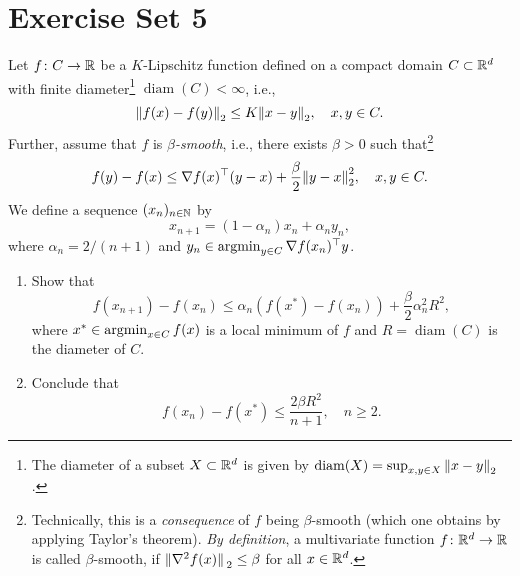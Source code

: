\section{Exercise Set 5}

\begin{exercise}
\end{exercise}


\begin{exercise}
\end{exercise}


\begin{exercise}
Let $f \colon C \to \mathbb{R}$ be a $K$-Lipschitz function defined on a compact domain $C \subset \mathbb{R}^d$ with finite diameter\footnote{The diameter of a subset $X \subset \mathbb{R}^d$ is given by $\operatorname{diam}(X) = \sup_{x, y \in X} \norm{x - y}_2$.} $\operatorname{diam}(C) < \infty$, i.e.,
\[
    \norm{f(x) - f(y)}_2 \leq K \norm{x - y}_2, \quad x, y \in C.
\]
Further, assume that $f$ is \emph{$\beta$-smooth}, i.e., there exists $\beta > 0$ such that\footnote{Technically, this is a \emph{consequence} of $f$ being $\beta$-smooth (which one obtains by applying Taylor's theorem). \emph{By definition}, a multivariate function $f \colon \mathbb{R}^d \to \mathbb{R}$ is called $\beta$-smooth, if $\norm*{\nabla^2 f(x)}_2 \leq \beta$ for all $x \in \mathbb{R}^d$.}
\[
    f(y) - f(x) \leq \nabla f(x)^{\top} (y - x) + \frac{\beta}{2} \norm{y - x}_2^2, \quad x, y \in C.
\]
We define a sequence $(x_n)_{n \in \mathbb{N}}$ by
\[
    x_{n+1} = (1 - \alpha_n)x_n + \alpha_n y_n,
\]
where $\alpha_n = 2 / (n+1)$ and $y_n \in \operatorname*{argmin}_{y \in C} \nabla f(x_n)^{\top} y$.
\begin{enumerate}
    \item Show that
            \[
                f(x_{n+1}) - f(x_n) \leq \alpha_n (f(x^*) - f(x_n)) + \frac{\beta}{2} \alpha_n^2 R^2,
            \]
        where $x^{*} \in \operatorname*{argmin}_{x \in C} f(x)$ is a local minimum of $f$ and $R = \operatorname{diam}(C)$ is the diameter of $C$.

    \item Conclude that
            \[
                f(x_n) - f(x^*) \leq \frac{2 \beta R^2}{n + 1}, \quad n \geq 2.
            \]
\end{enumerate}
\end{exercise}

